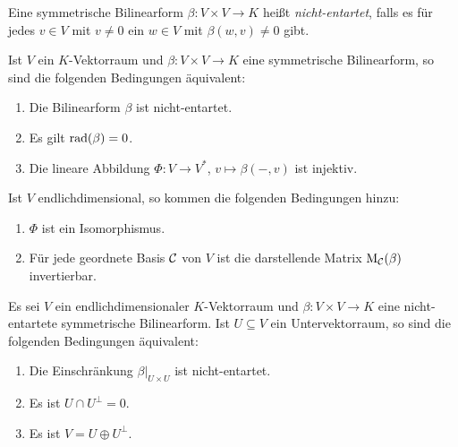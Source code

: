 \begin{definition}
  Eine symmetrische Bilinearform $\beta \colon V \times V \to K$ heißt \emph{nicht-entartet}, falls es für jedes $v \in V$ mit $v \neq 0$ ein $w \in V$ mit $\beta(w,v) \neq 0$ gibt.
\end{definition}


\begin{proposition}
  Ist $V$ ein $K$-Vektorraum und $\beta \colon V \times V \to K$ eine symmetrische Bilinearform, so sind die folgenden Bedingungen äquivalent:
  \begin{enumerate}[leftmargin=*, label=\roman*)]
    \item
      Die Bilinearform $\beta$ ist nicht-entartet.
    \item
      Es gilt $\operatorname{rad}(\beta) = 0$.
    \item
      Die lineare Abbildung $\Phi \colon V \to V^*$, $v \mapsto \beta(-,v)$ ist injektiv.
  \end{enumerate}
  Ist $V$ endlichdimensional, so kommen die folgenden Bedingungen hinzu:
  \begin{enumerate}[leftmargin=*, label=\roman*), resume]
    \item
      $\Phi$ ist ein Isomorphismus.
    \item
      Für jede geordnete Basis $\mathcal{C}$ von $V$ ist die darstellende Matrix $\mathrm{M}_{\mathcal{C}}(\beta)$ invertierbar.
  \end{enumerate}
\end{proposition}


\begin{proposition}
  Es sei $V$ ein endlichdimensionaler $K$-Vektorraum und $\beta \colon V \times V \to K$ eine nicht-entartete symmetrische Bilinearform.
  Ist $U \subseteq V$ ein Untervektorraum, so sind die folgenden Bedingungen äquivalent:
  \begin{enumerate}[leftmargin=*, label=\roman*)]
    \item
      Die Einschränkung $\beta|_{U \times U}$ ist nicht-entartet.
    \item
      Es ist $U \cap U^\perp = 0$.
    \item
      Es ist $V = U \oplus U^\perp$.
  \end{enumerate}
\end{proposition}











